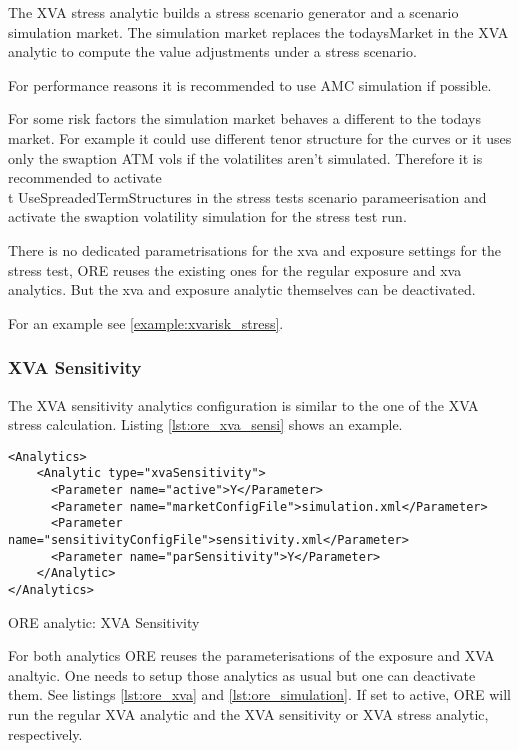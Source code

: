 {The XVA stress analytic builds a stress scenario generator and a scenario simulation market. The simulation market
replaces the todaysMarket in the XVA analytic to compute the value adjustments under a stress scenario.

For performance reasons it is recommended to use AMC simulation if possible. 

For some risk factors the simulation market behaves a different to the todays market. For example it could use different
tenor structure for the curves or it uses only the swaption ATM vols if the volatilites aren't simulated.
Therefore it is recommended to activate {\\t UseSpreadedTermStructures} in the stress tests scenario parameerisation 
and activate the swaption volatility simulation for the stress test run.

There is no dedicated parametrisations for the xva and exposure settings for the stress test, ORE reuses the existing
ones for the regular exposure and xva analytics. But the xva and exposure analytic themselves can be deactivated.

For an example see \ref{example:xvarisk_stress}.

\subsubsection{XVA Sensitivity}

The XVA sensitivity analytics configuration is similar to the one of the XVA stress calculation. Listing \ref{lst:ore_xva_sensi}
shows an example.

\begin{listing}[H]
\begin{verbatim}
<Analytics>
    <Analytic type="xvaSensitivity">
      <Parameter name="active">Y</Parameter>
      <Parameter name="marketConfigFile">simulation.xml</Parameter>
      <Parameter name="sensitivityConfigFile">sensitivity.xml</Parameter>
      <Parameter name="parSensitivity">Y</Parameter>
    </Analytic>
</Analytics>
\end{verbatim}
\caption{ORE analytic: XVA Sensitivity}
\label{lst:ore_xva_sensi}
\end{listing}

For both analytics ORE reuses the parameterisations of the exposure and XVA analtyic. One needs to setup those
analytics as usual but one can deactivate them. See listings \ref{lst:ore_xva} and \ref{lst:ore_simulation}.
If set to active, ORE will run the regular XVA analytic and the XVA sensitivity or XVA stress analytic, respectively.

}
